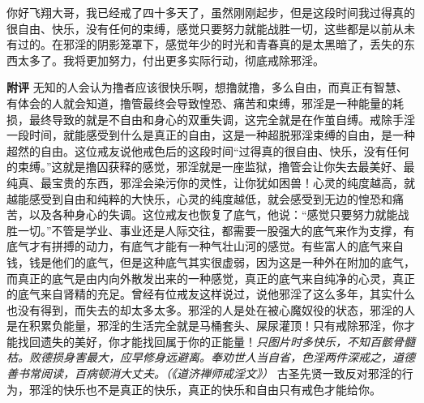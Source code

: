 \begin{case}
    你好飞翔大哥，我已经戒了四十多天了，虽然刚刚起步，但是这段时间我过得真的很自由、快乐，没有任何的束缚，感觉只要努力就能战胜一切，这些都是以前从未有过的。在邪淫的阴影笼罩下，感觉年少的时光和青春真的是太黑暗了，丢失的东西太多了。我将更加努力，付出更多实际行动，彻底戒除邪淫。

    \textbf{附评} 无知的人会认为撸者应该很快乐啊，想撸就撸，多么自由，而真正有智慧、有体会的人就会知道，撸管最终会导致惶恐、痛苦和束缚，邪淫是一种能量的耗损，最终导致的就是不自由和身心的双重失调，这完全就是在作茧自缚。戒除手淫一段时间，就能感受到什么是真正的自由，这是一种超脱邪淫束缚的自由，是一种超然的自由。这位戒友说他戒色后的这段时间“过得真的很自由、快乐，没有任何的束缚。”这就是撸囚获释的感觉，邪淫就是一座监狱，撸管会让你失去最美好、最纯真、最宝贵的东西，邪淫会染污你的灵性，让你犹如困兽！心灵的纯度越高，就越能感受到自由和纯粹的大快乐，心灵的纯度越低，就会感受到无边的惶恐和痛苦，以及各种身心的失调。这位戒友也恢复了底气，他说：“感觉只要努力就能战胜一切。”不管是学业、事业还是人际交往，都需要一股强大的底气来作为支撑，有底气才有拼搏的动力，有底气才能有一种气壮山河的感觉。有些富人的底气来自钱，钱是他们的底气，但是这种底气其实很虚弱，因为这是一种外在附加的底气，而真正的底气是由内向外散发出来的一种感觉，真正的底气来自纯净的心灵，真正的底气来自肾精的充足。曾经有位戒友这样说过，说他邪淫了这么多年，其实什么也没有得到，而失去的却太多太多。邪淫的人是处在被心魔奴役的状态，邪淫的人是在积累负能量，邪淫的生活完全就是马桶套头、屎尿灌顶！只有戒除邪淫，你才能找回遗失的美好，你才能找回属于你的正能量！\textit{只图片时多快乐，不知百骸骨髓枯。败德损身害最大，应早修身远避离。奉劝世人当自省，色淫两件深戒之，道德善书常阅读，百病顿消大丈夫。（《道济禅师戒淫文》）} 古圣先贤一致反对邪淫的行为，邪淫的快乐也不是真正的快乐，真正的快乐和自由只有戒色才能给你。
\end{case}


